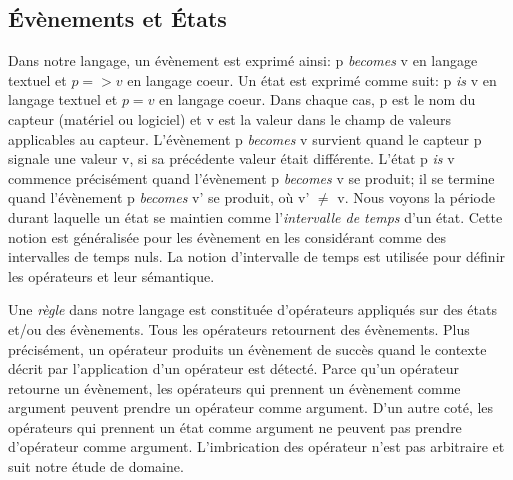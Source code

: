 \subsection{Évènements et États}
Dans notre langage, un évènement est exprimé ainsi: {\ttfamily p {\em becomes} v} en langage textuel et  $p=>v$ en langage coeur. Un état est exprimé comme suit: {\ttfamily p {\em is} v} en langage textuel et $p=v$ en langage coeur. Dans chaque cas, {\ttfamily p} est le nom du capteur (matériel ou logiciel) et {\ttfamily v} est la valeur dans le champ de valeurs applicables au capteur. L'évènement {\ttfamily p {\em becomes} v} survient quand le capteur {\ttfamily p} signale une valeur {\ttfamily v}, si sa précédente valeur était différente. L'état {\ttfamily p {\em is} v} commence précisément quand l'évènement {\ttfamily p {\em becomes} v} se produit; il se termine quand l'évènement {\ttfamily p {\em becomes} v'} se produit, où {\ttfamily v'} $\neq$ {\ttfamily v}. Nous voyons la période durant laquelle un état se maintien comme l'{\em intervalle de temps} d'un état. Cette notion est généralisée pour les évènement en les considérant comme des intervalles de temps nuls. La notion d'intervalle de temps est utilisée pour définir les opérateurs et leur sémantique.

Une {\em règle} dans notre langage est constituée d'opérateurs appliqués sur des états et/ou des évènements. Tous les opérateurs retournent des évènements.
Plus précisément, un opérateur produits un évènement de succès quand le contexte décrit par l'application d'un opérateur est détecté.
Parce qu'un opérateur retourne un évènement, les opérateurs qui prennent un évènement comme argument peuvent prendre un opérateur comme argument.
D'un autre coté, les opérateurs qui prennent un état comme argument ne peuvent pas prendre d'opérateur comme argument.
L'imbrication des opérateur n'est pas arbitraire et suit notre étude de domaine.

